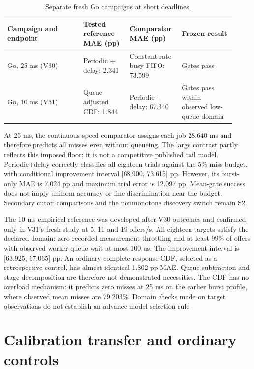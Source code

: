\documentclass[10pt,a4paper]{article}
\begin{document}
\begin{table}[t]
\centering
\caption{Separate fresh Go campaigns at short deadlines.}
\label{tab:deadlines}
\small\setlength{\tabcolsep}{3pt}\renewcommand{\arraystretch}{1.12}
\begin{tabular}{>{\raggedright\arraybackslash}p{0.3100\linewidth}>{\raggedright\arraybackslash}p{0.1900\linewidth}>{\raggedright\arraybackslash}p{0.2000\linewidth}>{\raggedright\arraybackslash}p{0.2200\linewidth}}
\toprule
Campaign and endpoint & Tested reference MAE (pp) & Comparator MAE (pp) & Frozen result \\
\midrule
Go, 25 ms (V30) & Periodic + delay: 2.341 & Constant-rate busy FIFO: 73.599 & Gates pass \\
Go, 10 ms (V31) & Queue-adjusted CDF: 1.844 & Periodic + delay: 67.340 & Gates pass within observed low-queue domain \\
\bottomrule
\end{tabular}
\end{table}

At 25 ms, the continuous-speed comparator assigns each job 28.640 ms and therefore predicts all misses even without queueing. The large contrast partly reflects this imposed floor; it is not a competitive published tail model. Periodic+delay correctly classifies all eighteen trials against the 5\% miss budget, with conditional improvement interval [68.900, 73.615] pp. However, its burst-only MAE is 7.024 pp and maximum trial error is 12.097 pp. Mean-gate success does not imply uniform accuracy or fine discrimination near the budget. Secondary cutoff comparisons and the nonmonotone discovery switch remain S2.

The 10 ms empirical reference was developed after V30 outcomes and confirmed only in V31's fresh study at 5, 11 and 19 offers/s. All eighteen targets satisfy the declared domain: zero recorded measurement throttling and at least 99\% of offers with observed worker-queue wait at most 100 us. The improvement interval is [63.925, 67.065] pp. An ordinary complete-response CDF, selected as a retrospective control, has almost identical 1.802 pp MAE. Queue subtraction and stage decomposition are therefore not demonstrated necessities. The CDF has no overload mechanism: it predicts zero misses at 25 ms on the earlier burst profile, where observed mean misses are 79.203\%. Domain checks made on target observations do not establish an advance model-selection rule.

\section{Calibration transfer and ordinary controls}
\end{document}
